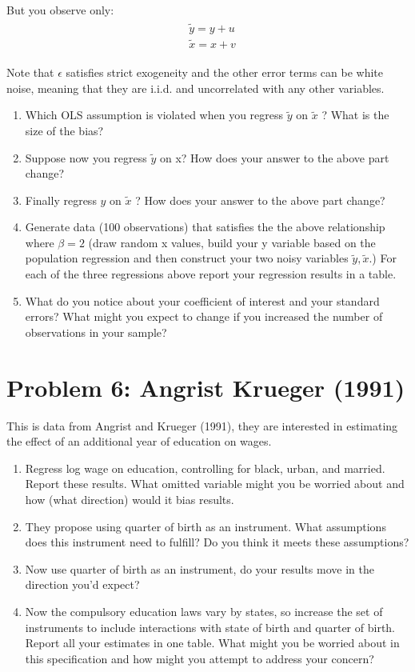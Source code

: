 \documentclass[11pt]{article}
\begin{document}
But you observe only:
\begin{align*}
\begin{aligned}
& \tilde{y}=y+u \\
& \tilde{x}=x+v
\end{aligned}
\end{align*}


Note that $\epsilon$ satisfies strict exogeneity and the other error terms can be white noise, meaning that they are i.i.d. and uncorrelated with any other variables.

\begin{enumerate}[label=\alph*.]
\item Which OLS assumption is violated when you regress $\tilde{y}$ on $\tilde{x}$ ? What is the size of the bias?
\item Suppose now you regress $\tilde{y}$ on x? How does your answer to the above part change?
\item  Finally regress $y$ on $\tilde{x}$ ? How does your answer to the above part change?
\item Generate data (100 observations) that satisfies the the above relationship where $\beta=2$ (draw random x values, build your y variable based on the population regression and then construct your two noisy variables $\tilde{y}, \tilde{x}$.) For each of the three regressions above report your regression results in a table.
\item What do you notice about your coefficient of interest and your standard errors? What might you expect to change if you increased the number of observations in your sample?
\end{enumerate}

\section*{\normalsize Problem 6: Angrist Krueger (1991)}
This is data from Angrist and Krueger (1991), they are interested in estimating the effect of an additional year of education on wages.
\begin{enumerate}[label=\alph*.]
\item Regress log wage on education, controlling for black, urban, and married. Report these results. What omitted variable might you be worried about and how (what direction) would it bias results.
\item They propose using quarter of birth as an instrument. What assumptions does this instrument need to fulfill? Do you think it meets these assumptions?
\item Now use quarter of birth as an instrument, do your results move in the direction you'd expect?
\item Now the compulsory education laws vary by states, so increase the set of instruments to include interactions with state of birth and quarter of birth. Report all your estimates in one table. What might you be worried about in this specification and how might you attempt to address your concern?
\end{enumerate}
\end{document}
